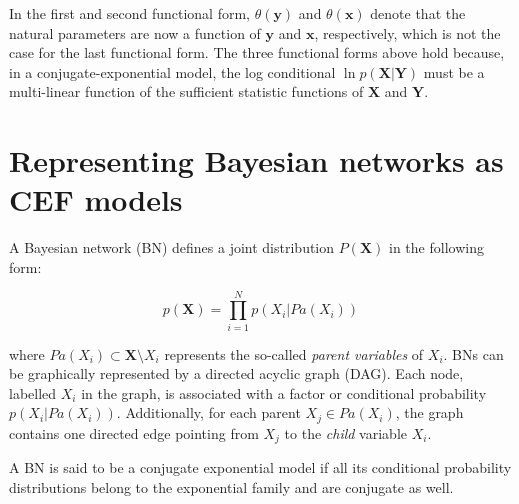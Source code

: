 \documentclass[11pt, oneside]{article}   	%
\newcommand{\bm}{\mathbf}
\numberwithin{figure}{section}
\numberwithin{equation}{section}
\numberwithin{table}{section}
\theoremstyle{definition}
\begin{document}
In the first and second functional form, $\theta(\bm y)$ and $\theta(\bm x)$ denote that the natural parameters are now a function of $\bm y$ and $\bm x$, respectively, which is not the case for the last functional form. The three functional forms above hold because, in a conjugate-exponential model, the log conditional $\ln p(\bm X| \bm Y )$ must be a multi-linear function of the sufficient statistic functions of $\bm X$ and $\bm Y$. 







\section{Representing Bayesian networks as CEF models}\label{Section:CEFBN}

A Bayesian network (BN) defines a joint distribution $P(\bm X)$ in the following form:

$$ p(\bm X) = \prod_{i=1}^N p(X_i|Pa(X_i))$$ 

\noindent where $Pa(X_i)\subset \bm X\setminus X_i$ represents the so-called \emph{parent variables} of $X_i$. BNs can be graphically represented by a directed acyclic graph (DAG). Each node, labelled $X_i$ in the graph, is associated with a factor or conditional probability $p(X_i|Pa(X_i))$. Additionally, for each parent $X_j \in Pa(X_i)$, the graph contains one directed edge pointing from $X_j$ to the \emph{child} variable $X_i$.

A BN is said to be a conjugate exponential model if all its conditional probability distributions belong to the exponential family and are conjugate as well. 

\end{document}
